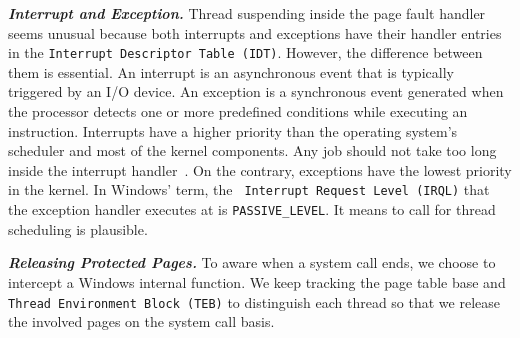 \textbf{\textit{Interrupt and Exception.}} Thread suspending inside the page fault handler seems unusual because both interrupts and exceptions have their handler entries in the \texttt{Interrupt Descriptor Table (IDT)}. However, the difference between them is essential.  An interrupt is an asynchronous event that is typically triggered by an I/O device. An exception is a synchronous event generated when the processor detects one or more predefined conditions while executing an instruction. Interrupts have a higher priority than the operating system's scheduler and most of the kernel components. Any job should not take too long inside the interrupt handler~\cite{msdnwatchdog}.  On the contrary, exceptions have the lowest priority in the kernel. In Windows' term, the \texttt{ Interrupt Request Level (IRQL)} that the exception handler executes at is \texttt{PASSIVE\_LEVEL}. It means to call for thread scheduling is plausible.






\textbf{\textit{Releasing Protected Pages.}} To aware when a system call ends, we choose to intercept a Windows internal function. We keep tracking the page table base and \texttt{Thread Environment Block (TEB)} to distinguish each thread so that we release the involved pages on the system call basis.  



